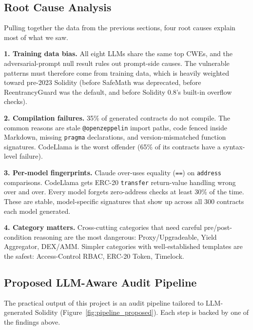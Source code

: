 \documentclass[11pt]{article}
\begin{document}
\subsection{Root Cause Analysis}
\label{sec:rootcause}

Pulling together the data from the previous sections, four root causes explain most of what we saw.

\textbf{1. Training data bias.} All eight LLMs share the same top CWEs, and the adversarial-prompt null result rules out prompt-side causes. The vulnerable patterns must therefore come from training data, which is heavily weighted toward pre-2023 Solidity (before SafeMath was deprecated, before ReentrancyGuard was the default, and before Solidity 0.8's built-in overflow checks).

\textbf{2. Compilation failures.} 35\% of generated contracts do not compile. The common reasons are stale \texttt{@openzeppelin} import paths, code fenced inside Markdown, missing \texttt{pragma} declarations, and version-mismatched function signatures. CodeLlama is the worst offender (65\% of its contracts have a syntax-level failure).

\textbf{3. Per-model fingerprints.} Claude over-uses equality (\texttt{==}) on \texttt{address} comparisons. CodeLlama gets ERC-20 \texttt{transfer} return-value handling wrong over and over. Every model forgets zero-address checks at least 30\% of the time. These are stable, model-specific signatures that show up across all 300 contracts each model generated.

\textbf{4. Category matters.} Cross-cutting categories that need careful pre/post-condition reasoning are the most dangerous: Proxy/Upgradeable, Yield Aggregator, DEX/AMM. Simpler categories with well-established templates are the safest: Access-Control RBAC, ERC-20 Token, Timelock.

\subsection{Proposed LLM-Aware Audit Pipeline}
\label{sec:pipeline}

The practical output of this project is an audit pipeline tailored to LLM-generated Solidity (Figure~\ref{fig:pipeline_proposed}). Each step is backed by one of the findings above.
\end{document}
